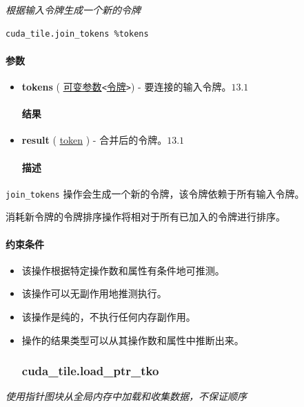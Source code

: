 \documentclass{article}
\begin{document}
\textit{根据输入令牌生成一个新的令牌}


\begin{lstlisting}
cuda_tile.join_tokens %tokens
\end{lstlisting}

\paragraph{参数}

\begin{itemize}
\item \textbf{tokens} ( \href{https://docs.nvidia.com/cuda/tile-ir/latest/sections/operations.html#type-variadic}{可变参数}\texttt{<}\href{https://docs.nvidia.com/cuda/tile-ir/latest/sections/operations.html#type-token}{令牌}\texttt{>}) - 要连接的输入令牌。$\boxed{13.1}$


\paragraph{结果}

\item \textbf{result} ( \href{https://docs.nvidia.com/cuda/tile-ir/latest/sections/operations.html#type-token}{token} ) - 合并后的令牌。$\boxed{13.1}$


\paragraph{描述}

\end{itemize}
\texttt{join\_tokens} 操作会生成一个新的令牌，该令牌依赖于所有输入令牌。

消耗新令牌的令牌排序操作将相对于所有已加入的令牌进行排序。



\paragraph{约束条件}

\begin{itemize}
\item 该操作根据特定操作数和属性有条件地可推测。
\item 该操作可以无副作用地推测执行。
\item 该操作是纯的，不执行任何内存副作用。
\item 操作的结果类型可以从其操作数和属性中推断出来。


\subsubsection{cuda\_tile.load\_ptr\_tko}

\end{itemize}
\textit{使用指针图块从全局内存中加载和收集数据，不保证顺序}
\end{document}
